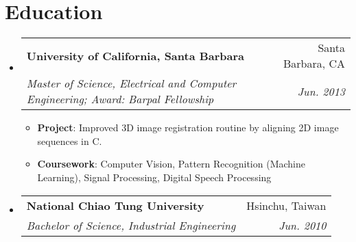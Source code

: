 \documentclass[letterpaper,12pt]{article}
\makeatletter
\newcommand{\resumeItem}[2]{
  \item\small{
    \textbf{#1}{: #2 \vspace{-2pt}}
  }
}
\newcommand{\resumeSubheading}[4]{
  \vspace{-1pt}\item
    \begin{tabular*}{0.97\textwidth}{l@{\extracolsep{\fill}}r}
      \textbf{#1} & #2 \\
      \textit{\small#3} & \textit{\small #4} \\
    \end{tabular*}\vspace{-5pt}
}
\newcommand{\resumeSubHeadingListStart}{\begin{itemize}[leftmargin=*]}
\newcommand{\resumeSubHeadingListEnd}{\end{itemize}}
\newcommand{\resumeItemListStart}{\begin{itemize}}
\newcommand{\resumeItemListEnd}{\end{itemize}\vspace{-5pt}}
\makeatother
\begin{document}
\section{Education}
  \resumeSubHeadingListStart
    \resumeSubheading
      {University of California, Santa Barbara}{Santa Barbara, CA}
      {Master of Science, Electrical and Computer Engineering; Award: Barpal Fellowship}{Jun. 2013}
    \resumeItemListStart
        \resumeItem{Project}
          {Improved 3D image registration routine by aligning 2D image sequences in C.}
        \resumeItem{Coursework}
          {Computer Vision, Pattern Recognition (Machine Learning), Signal Processing, Digital Speech Processing}
     \resumeItemListEnd
    \resumeSubheading
      {National Chiao Tung University}{Hsinchu, Taiwan}
      {Bachelor of Science, Industrial Engineering}{Jun. 2010}
  \resumeSubHeadingListEnd
\end{document}
